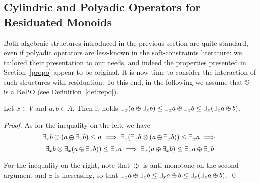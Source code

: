 \documentclass{llncs}
\def\odiv{\, {\ominus\hspace{-7.7pt} \div} \,}
\begin{document}


\subsection{Cylindric and Polyadic Operators for Residuated Monoids}
\label{cyre}
Both algebraic structures introduced in the previous section are quite standard,
even if polyadic operators are less-known in the soft-constraints literature:
we tailored their presentation to our needs, and indeed the properties
presented in Section~\ref{propo} appear to be original. It is now time to consider 
the interaction of such structures with residuation. 
%
To this end, in the following we assume that 
$\mathbb{S}$ is a RePO (see Definition~\ref{def:repo}).


\begin{lemma}
\label{divex}
Let $x \in V$ and $a, b \in A$.
Then it holds
         $\exists_x(a \odiv \exists_x b) \leq \exists_x a \odiv \exists_x b \leq
                                               \exists_x(\exists_x a \odiv b)$.
\end{lemma}

\begin{proof}
As for the inequality on the left, we have
 \[\exists_x b \otimes (a \odiv \exists_x b) \leq a \implies
   \exists_x(\exists_x b \otimes (a \odiv \exists_x b)) \leq \exists_x a \implies\]
 \[\exists_x b \otimes \exists_x(a \odiv \exists_x b)) \leq \exists_x a \implies
   \exists_x(a \odiv \exists_x b) \leq \exists_x a \odiv \exists_x b\]

For the inequality on the right, note that $\odiv$ is anti-monotone on the second argument and $\exists$ 
is increasing, so that $\exists_x a \odiv \exists_x b \leq \exists_x a \odiv b \leq \exists_x (\exists_x a \odiv b)$.
\qed
\end{proof}
\end{document}
